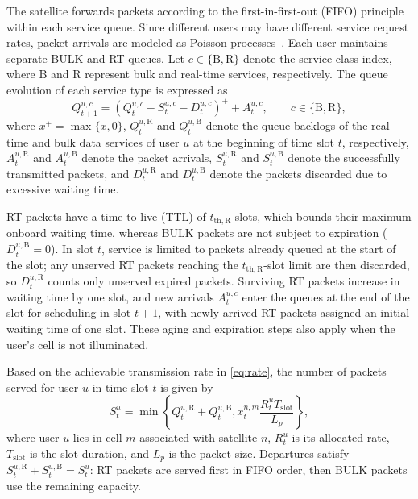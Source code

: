 \documentclass[journal]{IEEEtran}
\newcommand{\revbegin}[1]{\color{revisionblue}\ignorespaces}
\newcommand{\revend}[1]{\color{black}\ignorespaces}
\begin{document}
\revbegin{}The satellite forwards packets according to the first-in-first-out (FIFO) principle within each service queue. Since different users may have different service request rates, packet arrivals are modeled as Poisson processes~\cite{ref16}. Each user maintains separate BULK and RT queues. Let $c\in\{\mathrm{B},\mathrm{R}\}$ denote the service-class index, where $\mathrm{B}$ and $\mathrm{R}$ represent bulk and real-time services, respectively. The queue evolution of each service type is expressed as\revend{}
\begin{equation}
Q_{t+1}^{u,c}
=
\left(
Q_t^{u,c}
-
S_t^{u,c}
-
D_t^{u,c}
\right)^+
+
A_t^{u,c},
\qquad c\in\{\mathrm{B},\mathrm{R}\},
\end{equation}
where $x^+=\max\{x,0\}$, $Q_t^{u,\mathrm{R}}$ and $Q_t^{u,\mathrm{B}}$ denote the queue backlogs of the real-time and bulk data services of user $u$ at the beginning of time slot $t$, respectively, $A_t^{u,\mathrm{R}}$ and $A_t^{u,\mathrm{B}}$ denote the packet arrivals, $S_t^{u,\mathrm{R}}$ and $S_t^{u,\mathrm{B}}$ denote the successfully transmitted packets, and $D_t^{u,\mathrm{R}}$ and $D_t^{u,\mathrm{B}}$ denote the packets discarded due to excessive waiting time.

\revbegin{}RT packets have a time-to-live (TTL) of $t_{\mathrm{th},\mathrm{R}}$ slots, which bounds their maximum onboard waiting time, whereas BULK packets are not subject to expiration ($D_t^{u,\mathrm{B}}=0$). In slot $t$, service is limited to packets already queued at the start of the slot; any unserved RT packets reaching the $t_{\mathrm{th},\mathrm{R}}$-slot limit are then discarded, so $D_t^{u,\mathrm{R}}$ counts only unserved expired packets. Surviving RT packets increase in waiting time by one slot, and new arrivals $A_t^{u,c}$ enter the queues at the end of the slot for scheduling in slot $t+1$, with newly arrived RT packets assigned an initial waiting time of one slot. These aging and expiration steps also apply when the user's cell is not illuminated.\revend{}

Based on the achievable transmission rate in \eqref{eq:rate}, the number of packets served for user $u$ in time slot $t$ is given by
\begin{equation}
S_t^{u}
=
\min
\left\{
Q_t^{u,\mathrm{R}}+Q_t^{u,\mathrm{B}},
x_t^{n,m}\frac{R_t^{u}T_{\mathrm{slot}}}{L_p}
\right\},
\end{equation}
\revbegin{}where user $u$ lies in cell $m$ associated with satellite $n$, $R_t^u$ is its allocated rate, $T_{\mathrm{slot}}$ is the slot duration, and $L_p$ is the packet size. Departures satisfy $S_t^{u,\mathrm{R}}+S_t^{u,\mathrm{B}}=S_t^u$: RT packets are served first in FIFO order, then BULK packets use the remaining capacity.\revend{}
\end{document}
